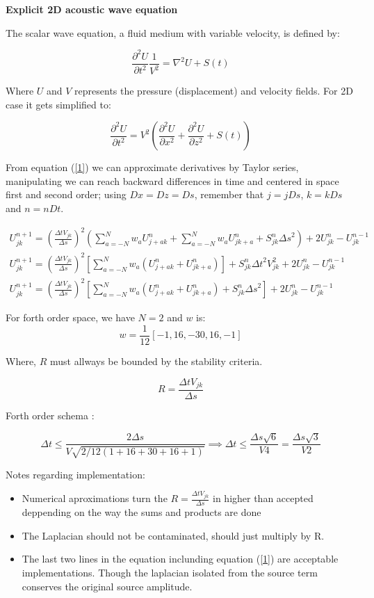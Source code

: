 \documentclass[legalpaper, 12pt]{article}
\begin{document}
\textbf{Explicit 2D acoustic wave equation }

The scalar wave equation, a fluid medium with variable velocity, is defined by:

\[ \frac{\partial^2 U}{\partial t^2} \frac{1}{V^2}= \nabla^2 U + S(t)\] 

Where $U$ and $V$ represents the pressure (displacement) and velocity fields. For 2D case it gets simplified to:

\begin{equation}
\frac{\partial^2 U}{\partial t^2} = V^2 \left( \frac{\partial^2 U}{\partial x^2}+ \frac{\partial^2 U}{\partial z^2} +S(t) \right)
\label{1}
\end{equation}

From equation (\ref{1}) we can approximate derivatives by Taylor series, manipulating we can reach backward differences in time and centered in space first and second order; using $Dx=Dz=Ds$, remember that $j=jDs$, $k=kDs$ and $n=nDt$.

\begin{multline}
U_{jk}^{n+1}  =  \left( \frac{\Delta t  V_{jk} }{\Delta s} \right) ^2 \left(  \sum_{a=-N}^N w_a U_{j+a k}^n + \sum_{a=-N}^N w_a U_{j k+a}^n +S_{jk}^n {\Delta s}^2 \right) + 2 U_{jk}^{n} - U_{jk}^{n-1}  \\
U_{jk}^{n+1}  =  \left( \frac{\Delta t  V_{jk}}{\Delta s} \right) ^2   \left[ \sum_{a=-N}^N  w_a \left( U_{j+a k}^n + U_{j k+a}^n \right) \right] + S_{jk}^n {\Delta t}^2 V_{jk}^2 + 2 U_{jk}^{n} - U_{jk}^{n-1} \\
U_{jk}^{n+1}  =  \left( \frac{\Delta t  V_{jk}}{\Delta s} \right) ^2  \left[ \sum_{a=-N}^N  w_a \left( U_{j+a k}^n + U_{j k+a}^n \right) + S_{jk}^n {\Delta s}^2\right] + 2 U_{jk}^{n} - U_{jk}^{n-1} \label{1}
\end{multline}

For forth order space, we have $N=2$ and $w$ is:
$$ w = \frac{1}{12} [-1, 16, -30, 16, -1] $$

Where, $ R $ must allways be bounded by the stability criteria.

\[ R = \frac{\Delta t  V_{jk}}{\Delta s} \]

Forth order schema :

$$ \Delta t \leq \frac{2 \Delta s}{ V \sqrt{2/12(1+16+30+16+1)}} \implies \Delta t \leq \frac{ \Delta s \sqrt{6}}{ V 4} = \frac{ \Delta s \sqrt{3}}{ V 2}$$

Notes regarding implementation:

\begin{itemize}
\item Numerical aproximations turn the $R = \frac{\Delta t  V_{jk}}{\Delta s}$ in higher than accepted deppending on the way the sums and products are done
\item The Laplacian should not be contaminated, should just multiply by R.
\item The last two lines in the equation inclunding equation (\ref{1}) are acceptable implementations. Though the laplacian isolated from the source term conserves the original source amplitude. 
\end{itemize}
 
\end{document}
